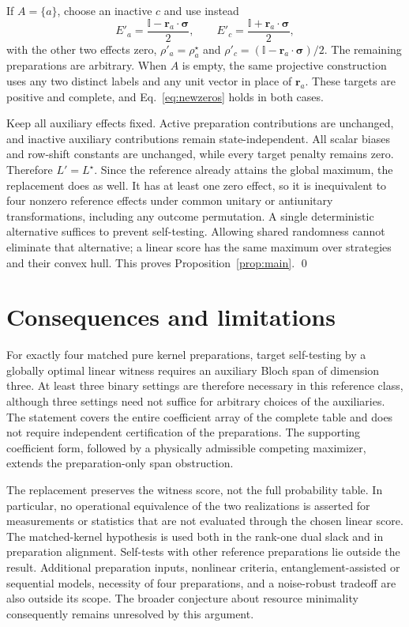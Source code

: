 \documentclass[11pt,a4paper]{article}
\newcommand{\id}{\mathbb{I}}
\newcommand{\bs}{\boldsymbol{\sigma}}
\newcommand{\rv}{\mathbf{r}}
\begin{document}
If $A=\{a\}$, choose an inactive $c$ and use instead
\begin{equation}
 E'_a=\frac{\id-\rv_a\cdot\bs}{2},\qquad
 E'_c=\frac{\id+\rv_a\cdot\bs}{2},
 \label{eq:projective}
\end{equation}
with the other two effects zero, $\rho'_a=\rho_a^\star$ and
$\rho'_c=(\id-\rv_a\cdot\bs)/2$. The remaining preparations are arbitrary.
When $A$ is empty, the same projective construction uses any two distinct
labels and any unit vector in place of $\rv_a$. These targets are positive
and complete, and Eq.~\eqref{eq:newzeros} holds in both cases.

Keep all auxiliary effects fixed. Active preparation contributions are
unchanged, and inactive auxiliary contributions remain state-independent.
All scalar biases and row-shift constants are unchanged, while every target
penalty remains zero. Therefore $L'=L^\star$. Since the reference already
attains the global maximum, the replacement does as well. It has at least
one zero effect, so it is inequivalent to four nonzero reference effects
under common unitary or antiunitary transformations, including any outcome
permutation. A single deterministic alternative suffices to prevent
self-testing. Allowing shared randomness cannot eliminate that alternative;
a linear score has the same maximum over strategies and their convex hull.
This proves Proposition~\ref{prop:main}. \qed

\section{Consequences and limitations}

For exactly four matched pure kernel preparations, target self-testing by a
globally optimal linear witness requires an auxiliary Bloch span of dimension
three. At least three binary settings are therefore necessary in this reference
class, although three settings need not suffice for arbitrary choices of the
auxiliaries. The statement covers the entire coefficient array of the complete
table and does not require independent certification of the preparations.
The supporting coefficient form, followed by a physically admissible competing
maximizer, extends the preparation-only span obstruction.

The replacement preserves the witness score, not the full probability table.
In particular, no operational equivalence of the two realizations is asserted
for measurements or statistics that are not evaluated through the chosen
linear score. The matched-kernel hypothesis is used both in the rank-one dual
slack and in preparation alignment. Self-tests with other reference preparations
lie outside the result. Additional preparation inputs, nonlinear criteria,
entanglement-assisted or sequential models, necessity of four preparations,
and a noise-robust tradeoff are also outside its scope. The broader conjecture
about resource minimality~\cite{Drotos2024} consequently remains unresolved by
this argument.
\end{document}
